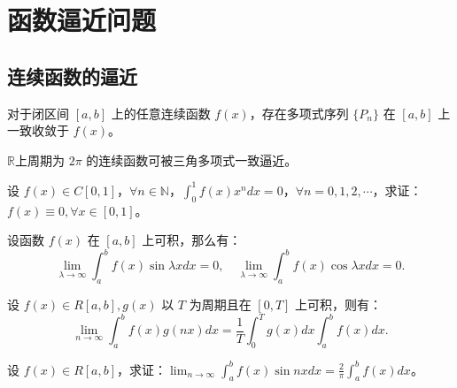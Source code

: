\documentclass[lang=cn,10pt,thmcnt=section]{elegantbook}
\begin{document}
\section{函数逼近问题}
\subsection{连续函数的逼近}
\begin{theorem}
	对于闭区间 $[a, b]$ 上的任意连续函数 $f(x)$，存在多项式序列 $\{P_n\}$ 在 $[a, b]$ 上一致收敛于 $f(x)$。
\end{theorem}
\begin{theorem}
	$\mathbb{R}$上周期为 $2\pi$ 的连续函数可被三角多项式一致逼近。
\end{theorem}


\begin{example}
	设 $f(x) \in C[0, 1]$，$\forall n \in \mathbb{N}$，$\int_0^1 f(x) x^n dx = 0$，$\forall n = 0, 1, 2, \cdots$，求证：$f(x) \equiv 0, \forall x \in [0, 1]$。
\end{example}
\begin{example}[Riemann 引理]
	设函数 $f(x)$ 在 $[a, b]$ 上可积，那么有：
\[
\lim_{\lambda \to \infty} \int_a^b f(x) \sin \lambda x dx = 0, \quad \lim_{\lambda \to \infty} \int_a^b f(x) \cos \lambda x dx = 0.
\]
\end{example}
\begin{example}
	设 $f(x) \in R[a, b], g(x)$ 以 $T$ 为周期且在 $[0, T]$ 上可积，则有：
    \[
    \lim_{n \to \infty} \int_a^b f(x) g(nx) dx = \frac{1}{T} \int_0^T g(x) dx \int_a^b f(x) dx.
    \]
\end{example}
\begin{example}
	设 $f(x) \in R[a, b]$，求证：$\lim_{n \to \infty} \int_a^b f(x) \sin nx dx = \frac{2}{\pi} \int_a^b f(x) dx$。
\end{example}
\end{document}
